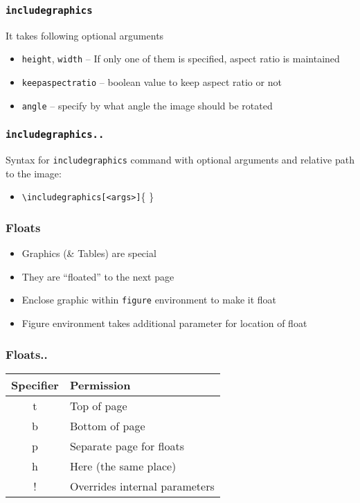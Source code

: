 \documentclass[17pt,compress]{beamer}
\begin{document}
\begin{frame}[fragile]
  \frametitle{\lstinline{includegraphics}}
  It takes following optional arguments
  \begin{itemize}
  \item \lstinline+height+, \lstinline+width+ -- If only one of them
    is specified, aspect ratio is maintained 
  \item \lstinline+keepaspectratio+ -- boolean value to keep aspect
    ratio or not 
  \item \lstinline+angle+ -- specify by what angle the image should
    be rotated 
  \end{itemize}
\end{frame}

\begin{frame}[fragile]
  \frametitle{\lstinline{includegraphics..}}
    Syntax for \lstinline{includegraphics} command with optional arguments and 
    relative path to the image:
  \begin{itemize}
  \item \lstinline{\includegraphics[<args>]}\{<img path> \}
  \end{itemize}
\end{frame}

\begin{frame}[fragile]
  \frametitle{Floats}
  \begin{itemize}
  \item Graphics (\& Tables) are special
  \item They are ``floated'' to the next page
  \item Enclose graphic within \lstinline+figure+ environment to make
    it float 
  \item Figure environment takes additional parameter for location of
    float 
  \end{itemize}
\end{frame}

\begin{frame}[fragile]
  \frametitle{Floats..}
\begin{table}
    \begin{tabular}{|c|l}
      Specifier & Permission\\\hline
      t & Top of page\\
      b & Bottom of page\\
      p & Separate page for floats\\
      h & Here (the same place)\\
      ! & Overrides internal parameters
    \end{tabular}
  \end{table}
\end{frame}
\end{document}
